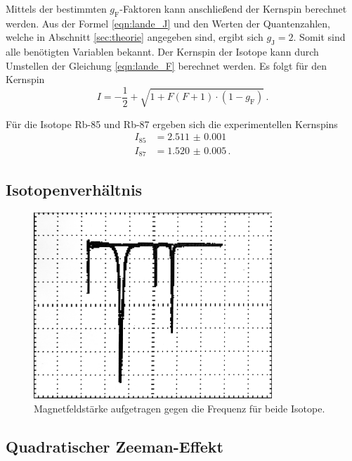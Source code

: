 Mittels der bestimmten $g_{\text{F}}$-Faktoren kann anschließend der Kernspin berechnet werden.
Aus der Formel \ref{eqn:lande_J} und den Werten der Quantenzahlen, welche in Abschnitt \ref{sec:theorie} angegeben sind,
ergibt sich $g_{\text{J}} = 2$.
Somit sind alle benötigten Variablen bekannt.
Der Kernspin der Isotope kann durch Umstellen der Gleichung \ref{eqn:lande_F} berechnet werden.
Es folgt für den Kernspin
\begin{equation}
    I = -\frac{1}{2} + \sqrt{1 + F(F+1) \cdot (1 - g_{\text{F}})} \, .
\end{equation}

Für die Isotope Rb-85 und Rb-87 ergeben sich die experimentellen Kernspins
\begin{align}
    I_{85} &= \qty{2.511(1)} \\
    I_{87} &= \qty{1.520(5)} \, .
\end{align}

\subsection{Isotopenverhältnis}
\label{sec:Isotopenverhältnis}

\begin{figure}
    \centering
    \includegraphics[width=0.8\textwidth]{content/messung/edit.jpg}
    \caption{Magnetfeldstärke aufgetragen gegen die Frequenz für beide Isotope.}
    \label{fig:edit}
\end{figure}

\subsection{Quadratischer Zeeman-Effekt}
\label{sec:quadratischer-zeeman-effekt}